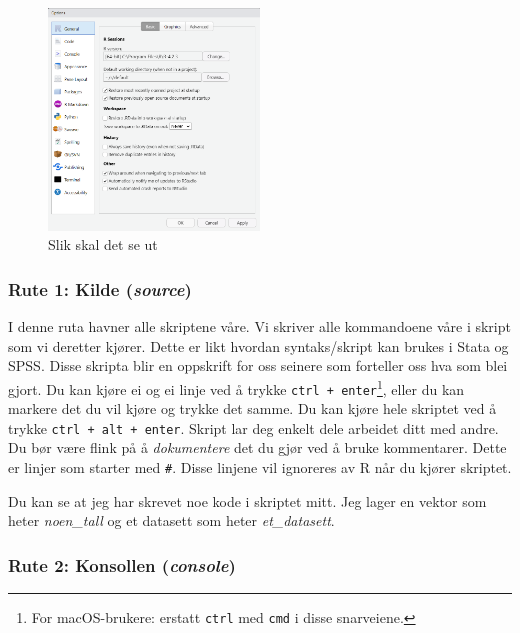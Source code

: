 \documentclass[
  letterpaper,
  DIV=11,
  numbers=noendperiod]{scrartcl}
\begin{document}
\begin{figure}

{\centering \includegraphics[width=0.5\textwidth,height=\textheight]{img/settings.png}

}

\caption{Slik skal det se ut}

\end{figure}

\hypertarget{rute-1-kilde-source}{%
\subsubsection{\texorpdfstring{Rute 1: Kilde
(\emph{source})}{Rute 1: Kilde (source)}}\label{rute-1-kilde-source}}

I denne ruta havner alle skriptene våre. Vi skriver alle kommandoene
våre i skript som vi deretter kjører. Dette er likt hvordan
syntaks/skript kan brukes i Stata og SPSS. Disse skripta blir en
oppskrift for oss seinere som forteller oss hva som blei gjort. Du kan
kjøre ei og ei linje ved å trykke \texttt{ctrl\ +\ enter}\footnote{For
  macOS-brukere: erstatt \texttt{ctrl} med \texttt{cmd} i disse
  snarveiene.}, eller du kan markere det du vil kjøre og trykke det
samme. Du kan kjøre hele skriptet ved å trykke
\texttt{ctrl\ +\ alt\ +\ enter}. Skript lar deg enkelt dele arbeidet
ditt med andre. Du bør være flink på å \emph{dokumentere} det du gjør
ved å bruke kommentarer. Dette er linjer som starter med \texttt{\#}.
Disse linjene vil ignoreres av R når du kjører skriptet.

Du kan se at jeg har skrevet noe kode i skriptet mitt. Jeg lager en
vektor som heter \emph{noen\_tall} og et datasett som heter
\emph{et\_datasett}.

\hypertarget{rute-2-konsollen-console}{%
\subsubsection{\texorpdfstring{Rute 2: Konsollen
(\emph{console})}{Rute 2: Konsollen (console)}}\label{rute-2-konsollen-console}}
\end{document}
